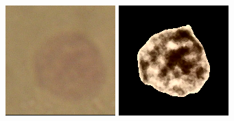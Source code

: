 \begin{figure}[t!]
	\centering
	\includegraphics[width=0.95\linewidth]{Figures/Chapter2/7a1.png}	
	\includegraphics[width=0.95\linewidth]{Figures/Chapter2/7a2.png}	
	\endminipage\hfill
	\centering	

\end{figure}
